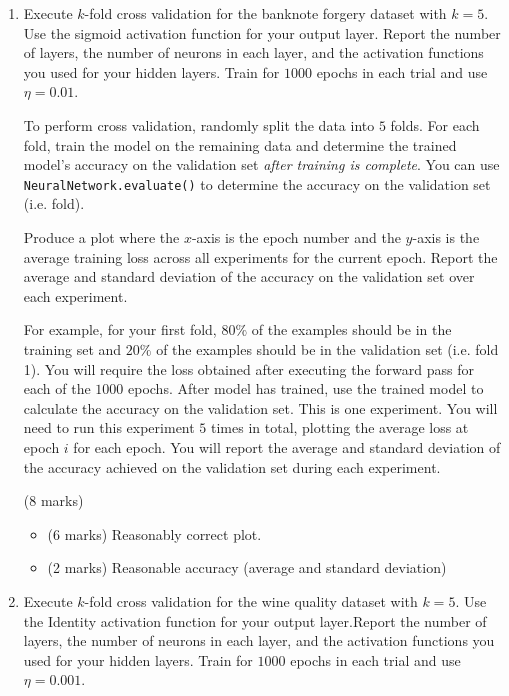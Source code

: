 \documentclass[12pt]{article}
\begin{document}
\begin{enumerate}[font=\Large,label=(\alph*)]
\item 
Execute $k$-fold cross validation for the banknote forgery dataset with $k=5$. Use the sigmoid activation function for your output layer. Report the number of layers, the number of neurons in each layer, and the activation functions you used for your hidden layers. Train for $1000$ epochs in each trial and use $\eta=0.01$.

To perform cross validation, randomly split the data into $5$ folds. For each fold, train the model on the remaining data and determine the trained model's accuracy on the validation set \textit{after training is complete}. You can use\\ \texttt{NeuralNetwork.evaluate()} to determine the accuracy on the validation set (i.e. fold). 

Produce a plot where the $x$-axis is the epoch number and the $y$-axis is the average  training loss across all experiments for the current epoch. Report the average and standard deviation of the accuracy on the validation set over each experiment.

For example, for your first fold, $80\%$ of the examples should be in the training set and $20\%$ of the examples should be in the validation set (i.e. fold 1). You will require the loss obtained after executing the forward pass for each of the $1000$ epochs. After model has trained, use the trained model to calculate the accuracy on the validation set. This is one experiment. You will need to run this experiment $5$ times in total, plotting the average loss at epoch $i$ for each epoch. You will report the average and standard deviation of the accuracy achieved on the validation set during each experiment.

\begin{markscheme}
(8 marks)

\begin{itemize}
    \item (6 marks) Reasonably correct plot.
    \item (2 marks) Reasonable accuracy (average and standard deviation)
\end{itemize}

\end{markscheme}


\item 
Execute $k$-fold cross validation for the wine quality dataset with $k=5$. Use the Identity activation function for your output layer.Report the number of layers, the number of neurons in each layer, and the activation functions you used for your hidden layers.  Train for $1000$ epochs in each trial and use $\eta=0.001$.


\end{enumerate}
\end{document}
